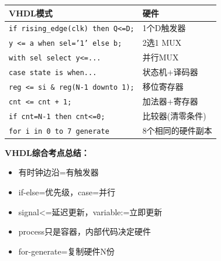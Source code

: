 \begin{detailbox}[完整教学]
\begin{center}
\begin{tabular}{|l|l|}
\hline
\textbf{VHDL模式} & \textbf{硬件} \\
\hline
\texttt{if rising\_edge(clk) then Q<=D;} & 1个D触发器 \\
\texttt{y <= a when sel='1' else b;} & 2选1 MUX \\
\texttt{with sel select y<=...} & 并行MUX \\
\texttt{case state is when...} & 状态机+译码器 \\
\texttt{reg <= si \& reg(N-1 downto 1);} & 移位寄存器 \\
\texttt{cnt <= cnt + 1;} & 加法器+寄存器 \\
\texttt{if cnt=N-1 then cnt<=0;} & 比较器(清零条件) \\
\texttt{for i in 0 to 7 generate} & 8个相同的硬件副本 \\
\hline
\end{tabular}
\end{center}

\begin{examfocus}
\textbf{VHDL综合考点总结：}
\begin{itemize}
  \item 有时钟边沿=有触发器
  \item if-else=优先级，case=并行
  \item signal<=延迟更新，variable:=立即更新
  \item process只是容器，内部代码决定硬件
  \item for-generate=复制硬件N份
\end{itemize}
\end{examfocus}
\end{detailbox}
